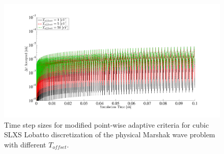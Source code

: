 \begin{figure}[!htp]
\centering
\includegraphics[width=16cm,trim=2in  0.4in 0.5in 0.75in,clip=true]{chapter6_grey_radtran/Dissertation_Data/Modified_Pointwise_T_offset.pdf}
\caption{Time step sizes for modified point-wise adaptive criteria for cubic SLXS Lobatto discretization of the physical Marshak wave problem with different $T_{offset}$.}
\label{fig:mod_comparison}
\end{figure}

